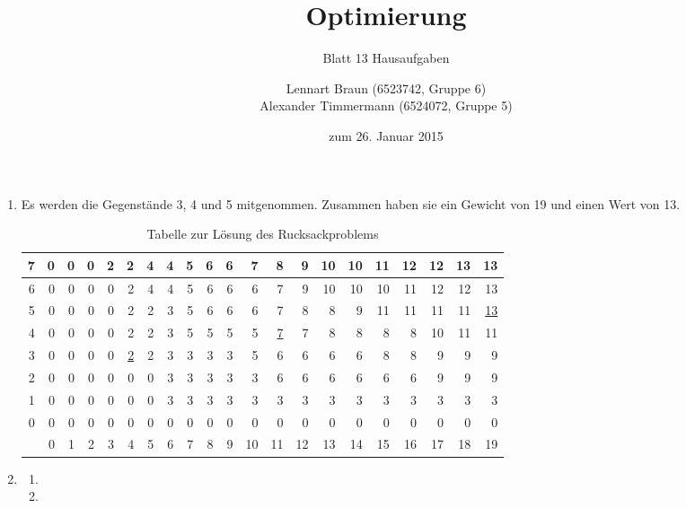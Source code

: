 \documentclass[a4paper]{scrartcl}
\title{Optimierung}
\subtitle{Blatt 13 Hausaufgaben}
\author{
	Lennart Braun (6523742, Gruppe 6) \\
    Alexander Timmermann (6524072, Gruppe 5)
}
\date{zum 26. Januar 2015}
\begin{document}
\maketitle

\begin{enumerate}[label=\bfseries\arabic*.]
    \item
        Es werden die Gegenstände 3, 4 und 5 mitgenommen.
        Zusammen haben sie ein Gewicht von 19 und einen Wert von 13.
        \begin{table}[h]
            \centering
            \begin{tabular}{r|r|r|r|r|r|r|r|r|r|r|r|r|r|r|r|r|r|r|r|r|}
                \hline
                7 & 0 & 0 & 0 & 2 & 2 & 4 & 4 & 5 & 6 & 6 &  7 &  8 &  9 & 10 & 10 & 11 & 12 & 12 & 13 & 13 \\ \hline
                6 & 0 & 0 & 0 & 0 & 2 & 4 & 4 & 5 & 6 & 6 &  6 &  7 &  9 & 10 & 10 & 10 & 11 & 12 & 12 & 13 \\ \hline
                5 & 0 & 0 & 0 & 0 & 2 & 2 & 3 & 5 & 6 & 6 &  6 &  7 &  8 &  8 &  9 & 11 & 11 & 11 & 11 & \underline{13} \\ \hline
                4 & 0 & 0 & 0 & 0 & 2 & 2 & 3 & 5 & 5 & 5 &  5 &  \underline{7} &  7 &  8 &  8 &  8 &  8 & 10 & 11 & 11 \\ \hline
                3 & 0 & 0 & 0 & 0 & \underline{2} & 2 & 3 & 3 & 3 & 3 &  5 &  6 &  6 &  6 &  6 &  8 &  8 &  9 &  9 &  9 \\ \hline
                2 & 0 & 0 & 0 & 0 & 0 & 0 & 3 & 3 & 3 & 3 &  3 &  6 &  6 &  6 &  6 &  6 &  6 &  9 &  9 &  9 \\ \hline
                1 & 0 & 0 & 0 & 0 & 0 & 0 & 3 & 3 & 3 & 3 &  3 &  3 &  3 &  3 &  3 &  3 &  3 &  3 &  3 &  3 \\ \hline
                0 & 0 & 0 & 0 & 0 & 0 & 0 & 0 & 0 & 0 & 0 &  0 &  0 &  0 &  0 &  0 &  0 &  0 &  0 &  0 &  0 \\ \hline
                  & 0 & 1 & 2 & 3 & 4 & 5 & 6 & 7 & 8 & 9 & 10 & 11 & 12 & 13 & 14 & 15 & 16 & 17 & 18 & 19 \\
            \end{tabular}
            \caption{Tabelle zur Lösung des Rucksackproblems}
            \label{tab:rucksack}
        \end{table}

    \item
        \begin{enumerate}
            \item

            \item

        \end{enumerate}

\end{enumerate}
\end{document}
